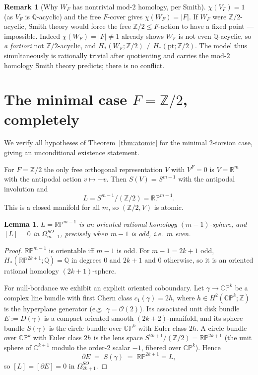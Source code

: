 \documentclass[12pt]{article}
\newtheorem{lemma}[theorem]{Lemma}
\theoremstyle{definition}
\newtheorem{remark}[theorem]{Remark}
\begin{document}
\begin{remark}[Why $W_F$ has nontrivial mod-$2$ homology, per Smith]
$\chi(V_F)=1$ (as $V_F$ is $\mathbb{Q}$-acyclic) and the free $F$-cover gives
$\chi(W_F)=|F|$. If $W_F$ were $\mathbb{Z}/2$-acyclic, Smith theory would force
the free $\mathbb{Z}/2\le F$-action to have a fixed point --- impossible. Indeed
$\chi(W_F)=|F|\neq1$ already shows $W_F$ is not even $\mathbb{Q}$-acyclic, so
\emph{a fortiori} not $\mathbb{Z}/2$-acyclic, and $H_*(W_F;\mathbb{Z}/2)\neq
H_*(\mathrm{pt};\mathbb{Z}/2)$. The model thus simultaneously is rationally
trivial after quotienting and carries the mod-$2$ homology Smith theory
predicts; there is no conflict.
\end{remark}

\section{The minimal case $F=\mathbb{Z}/2$, completely}\label{sec:Z2}

We verify all hypotheses of Theorem~\ref{thm:atomic} for the minimal
$2$-torsion case, giving an unconditional existence statement.

For $F=\mathbb{Z}/2$ the only free orthogonal representation $V$ with $V^F=0$ is
$V=\mathbb{R}^{m}$ with the antipodal action $v\mapsto-v$. Then $S(V)=S^{m-1}$
with the antipodal involution and
\[
   L=S^{m-1}/(\mathbb{Z}/2)=\mathbb{RP}^{m-1}.
\]
This is a closed manifold for all $m$, so $(\mathbb{Z}/2,V)$ is atomic.

\begin{lemma}\label{lem:RPodd}
$L=\mathbb{RP}^{m-1}$ is an oriented rational homology $(m-1)$-sphere, and
$[L]=0$ in $\Omega^{SO}_{m-1}$, precisely when $m-1$ is odd, i.e.\ $m$ even.
\end{lemma}
\begin{proof}
$\mathbb{RP}^{m-1}$ is orientable iff $m-1$ is odd. For $m-1=2k+1$ odd,
$H_*(\mathbb{RP}^{2k+1};\mathbb{Q})=\mathbb{Q}$ in degrees $0$ and $2k+1$ and $0$
otherwise, so it is an oriented rational homology $(2k+1)$-sphere.

For null-bordance we exhibit an explicit oriented coboundary. Let
$\gamma\to\mathbb{CP}^k$ be a complex line bundle with first Chern class
$c_1(\gamma)=2h$, where $h\in H^2(\mathbb{CP}^k;\mathbb{Z})$ is the hyperplane
generator (e.g.\ $\gamma=\mathcal{O}(2)$). Its associated unit disk bundle
$E:=D(\gamma)$ is a compact oriented smooth $(2k+2)$-manifold, and its sphere
bundle $S(\gamma)$ is the circle bundle over $\mathbb{CP}^k$ with Euler class
$2h$. A circle bundle over $\mathbb{CP}^k$ with Euler class $2h$ is the lens
space $S^{2k+1}/(\mathbb{Z}/2)=\mathbb{RP}^{2k+1}$ (the unit sphere of
$\mathbb{C}^{k+1}$ modulo the order-$2$ scalar $-1$, fibered over
$\mathbb{CP}^k$). Hence
\[
  \partial E \;=\; S(\gamma)\;=\;\mathbb{RP}^{2k+1}=L,
\]
so $[L]=[\partial E]=0$ in $\Omega^{SO}_{2k+1}$.
\end{proof}
\end{document}
